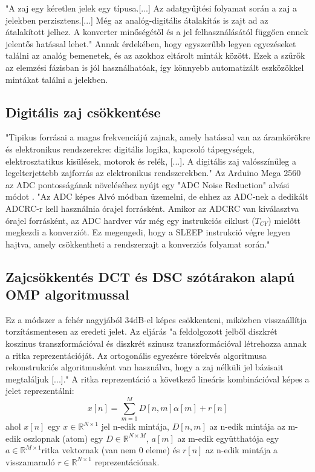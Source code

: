 "A zaj egy kéretlen jelek egy típusa.[...] Az adatgyűjtési folyamat során a zaj a jelekben perzisztens.[...] 
Még az analóg-digitális átalakítás is zajt ad az átalakított jelhez. 
A konverter minőségétől és a jel felhasználásától függően ennek jelentős hatással lehet."\cite{noise_reduction_omp}
Annak érdekében, hogy egyszerűbb legyen egyezéseket találni az analóg bemenetek, és az azokhoz eltárolt minták között.
Ezek a szűrők az elemzési fázisban is jól használhatóak, így könnyebb automatizált eszközökkel mintákat találni a jelekben.

\subsection{Digitális zaj csökkentése} \label{ADC_noise}
"Tipikus forrásai a magas frekvenciájú zajnak, amely hatással van az áramkörökre és elektronikus rendszerekre: digitális logika, kapcsoló tápegységek, elektrosztatikus kisülések, motorok és relék, [...]. 
A digitális zaj valósszínűleg a legelterjettebb zajforrás az elektronikus rendszerekben."\cite{smith1992high}
Az Arduino Mega 2560 az ADC pontosságának növeléséhez nyújt egy "ADC Noise Reduction" alvási módot \cite{arduino_at_mega_datasheet}. 
"Az ADC képes Alvó módban üzemelni, de ehhez az ADC-nek a dedikált ADCRC-r kell használnia órajel forrásként. 
Amikor az ADCRC van kiválasztva órajel forrásként, az ADC hardver vár még egy instrukciós ciklust ($T_{CY}$) mielőtt megkezdi a konverziót. 
Ez megengedi, hogy a SLEEP instrukció végre legyen hajtva, amely csökkentheti a rendszerzajt a konverziós folyamat során."\cite{ATmega_processor_datasheet}

\subsection{Zajcsökkentés DCT és DSC szótárakon alapú OMP algoritmussal} \label{OMP}

Ez a módszer a fehér nagyjából 34dB-el képes csökkenteni, miközben visszaállítja torzításmentesen az eredeti jelet.\cite{noise_reduction_omp}
Az eljárás "a feldolgozott jelből diszkrét koszinus transzformációval és diszkrét szinusz transzformációval létrehozza annak a ritka reprezentációját. Az ortogonális egyezésre törekvés algoritmusa rekonstrukciós algoritmusként van használva, hogy a zaj nélküli jel bázisait megtaláljuk [...]."\cite{noise_reduction_omp}
A ritka reprezentáció a következő lineáris kombinációval képes a jelet reprezentálni:
\[x[n]=\sum_{m=1}^{M}D[n,m]\alpha[m]+r[n]\]
ahol $x[n]$ egy $x \in \mathbb{R}^{N \times 1}$ jel n-edik mintája, $D[n,m]$ az n-edik mintája az m-edik oszlopnak (atom) egy $D \in \mathbb{R}^{N \times M}$, $a[m]$ az m-edik együtthatója egy $a \in \mathbb{R}^{M \times 1}$ritka vektornak (van nem 0 eleme) és $r[n]$ az n-edik mintája a visszamaradó $r \in \mathbb{R}^{N \times 1}$ reprezentációnak.\cite{noise_reduction_omp}

